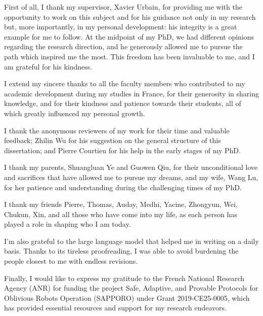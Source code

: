 

First of all, I thank my supervisor, Xavier Urbain, for providing me with the opportunity to work on this subject and for his guidance not only in my research but, more importantly, in my personal development: his integrity is a great example for me to follow. At the midpoint of my PhD, we had different opinions regarding the research direction, and he generously allowed me to pursue the path which inspired me the most. This freedom has been invaluable to me, and I am grateful for his kindness.

I extend my sincere thanks to all the faculty members who contributed to my academic development during my studies in France, for their generosity in sharing knowledge, and for their kindness and patience towards their students, all of which greatly influenced my personal growth.

I thank the anonymous reviewers of my work for their time and valuable feedback; Zhilin Wu for his suggestion on the general structure of this dissertation; and Pierre Courtieu for his help in the early stages of my PhD.

I thank my parents, Shuangluan Ye and Guowen Qiu, for their unconditional love and sacrifices that have allowed me to pursue my dreams, and my wife, Wang Lu, for her patience and understanding during the challenging times of my PhD.

I thank my friends Pierre, Thomas, Auday, Medhi, Yacine, Zhongyun, Wei, Chukun, Xin, and all those who have come into my life, as each person has played a role in shaping who I am today.

I'm also grateful to the large language model that helped me in writing on a daily basis. Thanks to its tireless proofreading, I was able to avoid burdening the people closest to me with endless revisions.


Finally, I would like to express my gratitude to the French National Research Agency (ANR) for funding the project Safe, Adaptive, and Provable Protocols for Oblivious Robots Operation (SAPPORO) under Grant 2019-CE25-0005, which has provided essential resources and support for my research endeavors.  
